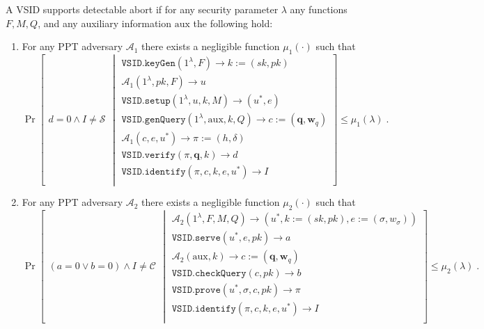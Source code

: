 \begin{definition}\label{def::VSID-Identifiable-Abort}  A  VSID  supports  detectable abort if for any  security parameter $\lambda$ any  functions $F, M,Q$, and any auxiliary information $\text{aux}$ the following hold: 

\begin{enumerate}
\item For any PPT adversary $\mathcal{A}_{\scriptscriptstyle 1}$ there exists a negligible function $\mu_{\scriptscriptstyle 1}(\cdot)$ such that
{\small
$$ \Pr\left[
  \begin{array}{l}
 d=0 \wedge I\neq\mathcal{S}
\end{array} \middle |
    \begin{array}{l}
    \mathtt{VSID.keyGen}(1^{\lambda},F)\rightarrow k:=(sk,pk)\\
    \mathcal{A}_{\scriptscriptstyle 1}(1^{\scriptscriptstyle\lambda},pk, F)\rightarrow u\\
    \mathtt{VSID.setup}(1^{\lambda}, u, k, M)\rightarrow (u^{\scriptscriptstyle *},e)\\
    \mathtt{VSID.genQuery}(1^{\lambda},  \text{aux},k,Q)\rightarrow c:=(\bm{q}, \bm{w}_{q})\\
     \mathcal{A}_{\scriptscriptstyle 1}(c,e, u^{\scriptscriptstyle *})\rightarrow \pi:=(h,\delta)\\
     \mathtt{VSID.verify}(\pi,\bm{q},k)\rightarrow d\\
     \mathtt{VSID.identify}(\pi,c,k,e,u^{\scriptscriptstyle *})\rightarrow I\\
\end{array}    \right]\leq \mu_{\scriptscriptstyle 1}(\lambda)\;.$$
}

\item For any PPT adversary $\mathcal{A}_{\scriptscriptstyle 2}$ there exists a negligible function $\mu_{\scriptscriptstyle 2}(\cdot)$ such that
{\small
$$ \Pr\left[
  \begin{array}{l}
 (a=0 \vee b=0)\wedge I\neq\mathcal{C}
\end{array} \middle |
    \begin{array}{l}
    
    \mathcal{A}_{\scriptscriptstyle 2}(1^{\scriptscriptstyle\lambda},F,M,Q)\rightarrow (u^{\scriptscriptstyle *},k:=(sk,pk),e:=(\sigma,w_{\sigma}))\\
    \mathtt{VSID.serve}(u^{\scriptscriptstyle *},e,pk)\rightarrow a\\
       \mathcal{A}_{\scriptscriptstyle 2}(\text{aux},k)\rightarrow c:=(\bm{q},\bm{w}_{\scriptscriptstyle q})\\
    \mathtt{VSID.checkQuery}(c, pk)\rightarrow b\\
    \mathtt{VSID.prove}(u^{\scriptscriptstyle *},\sigma,c,pk)\rightarrow \pi\\
    \mathtt{VSID.identify}(\pi,c,k,e,u^{\scriptscriptstyle *})\rightarrow I\\
\end{array}    \right]\leq \mu_{\scriptscriptstyle 2}(\lambda)\;.$$
}

\end{enumerate}
\end{definition}


